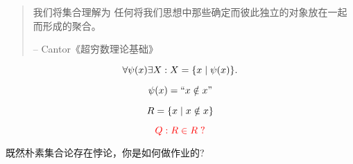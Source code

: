 
\begin{frame}{}

  \begin{columns}
    \pause
    \pause
    \pause
  \end{columns}
\end{frame}

\begin{frame}{}
  \begin{quote}
    我们将集合理解为
    任何将我们思想中那些确定而彼此独立的对象放在一起而形成的聚合。

    \hfill -- Cantor《超穷数理论基础》
  \end{quote}

  \pause
  \vspace{1.00cm}
  \begin{theorem}[概括原则]
    \[
      \forall \psi(x) \exists X: X = \{x \mid \psi(x)\}.
    \]
  \end{theorem}
\end{frame}

\begin{frame}{}
  \begin{definition}
    \[
      \psi(x) = ``x \notin x"
    \]

    \pause
    \[
      R = \{x \mid x \notin x\}
    \]

    \pause
    \[
      \textcolor{red}{Q: R \in R\;?}
    \]
  \end{definition}
\end{frame}

\begin{frame}{}
  \begin{center}
     既然朴素集合论存在悖论，你是如何做作业的?
    \vspace{0.60cm}
  \end{center}
\end{frame}

